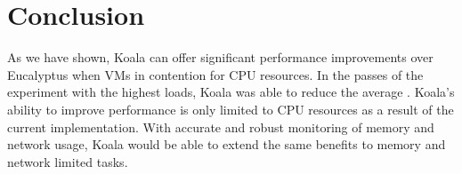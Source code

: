 \section{Conclusion}
\label{sec:conclusion}

As we have shown, Koala can offer significant performance improvements over Eucalyptus when VMs in contention for CPU resources.  In the passes of the experiment with the highest loads, Koala was able to reduce the average .  Koala's ability to improve performance is only limited to CPU resources as a result of the current implementation.  With accurate and robust monitoring of memory and network usage, Koala would be able to extend the same benefits to memory and network limited tasks.  

